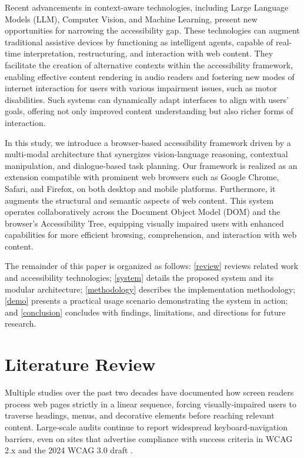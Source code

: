 \documentclass[conference]{IEEEtran}
\begin{document}
Recent advancements in context-aware technologies, including Large Language Models (LLM), Computer Vision, and Machine Learning, present new opportunities for narrowing the accessibility gap. These technologies can augment traditional assistive devices by functioning as intelligent agents, capable of real-time interpretation, restructuring, and interaction with web content. They facilitate the creation of alternative contexts within the accessibility framework, enabling effective content rendering in audio readers and fostering new modes of internet interaction for users with various impairment issues, such as motor disabilities. Such systems can dynamically adapt interfaces to align with users' goals, offering not only improved content understanding but also richer forms of interaction.

In this study, we introduce a browser-based accessibility framework driven by a multi-modal architecture that synergizes vision-language reasoning, contextual manipulation, and dialogue-based task planning. Our framework is realized as an extension compatible with prominent web browsers such as Google Chrome, Safari, and Firefox, on both desktop and mobile platforms. Furthermore, it augments the structural and semantic aspects of web content. This system operates collaboratively across the Document Object Model (DOM) and the browser's Accessibility Tree, equipping visually impaired users with enhanced capabilities for more efficient browsing, comprehension, and interaction with web content.

The remainder of this paper is organized as follows: \autoref{review} reviews related work and accessibility technologies; \autoref{system} details the proposed system and its modular architecture; \autoref{methodology} describes the implementation methodology; \autoref{demo} presents a practical usage scenario demonstrating the system in action; and \autoref{conclusion} concludes with findings, limitations, and directions for future research.


\section{Literature Review}\label{review}

Multiple studies over the past two decades have documented how screen readers process web pages strictly in a linear sequence, forcing visually‑impaired users to traverse headings, menus, and decorative elements before reaching relevant content. \cite{Ramakrishnan2017-rn, wcagchallenges2025, martins2024large, abuaddous2016web} Large‑scale audits continue to report widespread keyboard‑navigation barriers, even on sites that advertise compliance with success criteria in WCAG 2.x and the 2024 WCAG 3.0 draft \cite{wcagchallenges2025}. 
\end{document}
